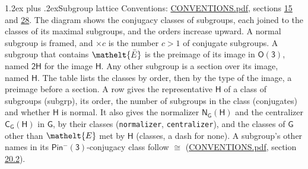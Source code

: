 \documentclass[10pt,a4paper]{article}
\makeatletter
\renewcommand\section{\@startsection{section}{1}{\z@}{-3ex plus -1ex minus -.2ex}%
  {1.2ex plus .2ex}{\normalfont\large\sffamily\bfseries\color{parttitle}}}
\numberwithin{equation}{section}
\newcommand{\eltfont}[1]{{\let\sigma\eltsigma\mathelt{#1}}}
\newcommand{\grp}[1]{\mathsf{#1}}
\newcommand{\cls}[1]{\eltfont{#1}}
\newcommand{\elt}[1]{\eltfont{#1}}
\newcommand{\samecls}{\cong}
\newcommand{\barred}[1]{\bar{#1}}
\makeatother
\begin{document}
\section{Subgroup lattice}\label{s:subgroups}
Conventions: \href{../../CONVENTIONS.pdf}{CONVENTIONS.pdf}, sections \href{../../../rotation/CONVENTIONS.pdf\#conv.15}{15} and \href{../../CONVENTIONS.pdf\#conv.28}{28}.
The diagram shows the conjugacy classes of subgroups, each joined to the classes of its maximal subgroups, and the orders increase upward. \label{n:index.conjugates.c}A normal subgroup is framed, and ${\times}c$ is the number $c > 1$ of conjugate subgroups. \label{n:group.H}A subgroup that contains $\elt{\barred{E}}$ is the preimage of its image in $\grp{O(3)}$, named $\grp{2H}$ for the image $\grp{H}$. Any other subgroup is a section over its image, named $\grp{H}$. The table lists the classes by order, then by the type of the image, a preimage before a section. \label{n:head.subgroup}\label{n:head.order}\label{n:head.conjugates}\label{n:head.normal}A row gives the representative $\grp{H}$ of a class of subgroups (subgrp), its order, the number of subgroups in the class (conjugates) and whether $\grp{H}$ is normal. \label{n:group.normalizer}\label{n:group.centralizer}\label{n:head.classes}It also gives the normalizer $\grp{N}_{\grp{G}}(\grp{H})$ and the centralizer $\grp{C}_{\grp{G}}(\grp{H})$ in $\grp{G}$, by their classes (\texttt{normalizer}, \texttt{centralizer}), and the classes of $\grp{G}$ other than $\cls{E}$ met by $\grp{H}$ (classes, a dash for none). A subgroup's other names in its \href{Pinminus3.pdf}{$\grp{Pin^{-}(3)}$}-conjugacy class follow $\samecls$ (\href{../../CONVENTIONS.pdf}{CONVENTIONS.pdf}, section \href{../../CONVENTIONS.pdf\#conv.20.2}{20.2}).
\begin{center}
\end{center}
\end{document}
